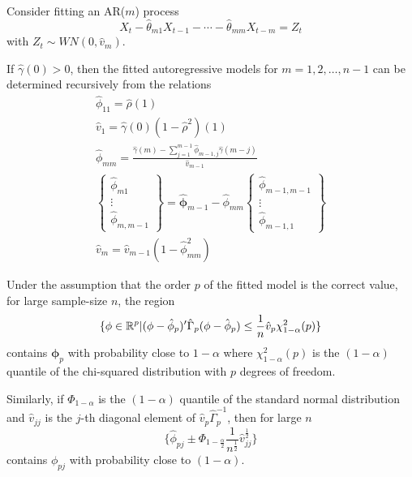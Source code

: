 \begin{thm}
  \label{defn:estimation_arma:3}
  Consider fitting an AR($m$) process
  \begin{equation}
    \label{eq:49}
    X_{t} - \hat \theta_{m1} X_{t-1} - \cdots - \hat \theta_{mm}
    X_{t-m} = Z_{t}
  \end{equation} with $Z_{t} \sim WN(0, \hat v_{m})$.

  If $\hat \gamma(0) > 0$, then the fitted autoregressive models for
  $m = 1, 2, \dots, n - 1$ can be determined recursively from the
  relations
  \begin{align}
    \label{eq:48}
    \hat \phi_{11} = \hat \rho(1) \\
    \hat v_{1} = \hat \gamma(0) (1 - \hat \rho^{2})(1) \\
    \hat \phi_{mm} = \frac{\hat \gamma(m) - \sum_{j=1}^{m-1} \hat
      \phi_{m-1, j} \hat \gamma(m - j)}{\hat v_{m-1}} \\
    \begin{Bmatrix}
      \hat \phi_{m1} \\
      \vdots \\
      \hat \phi_{m, m - 1}
    \end{Bmatrix}
    = \hat{\mathbf{\phi}}_{m-1} - \hat \phi_{mm}
    \begin{Bmatrix}
      \hat \phi_{m-1, m-1} \\
      \vdots\ \\
      \hat \phi_{m-1, 1}
    \end{Bmatrix} \\
    \hat v_{m} = \hat v_{m-1}(1 - \hat \phi^{2}_{mm})
  \end{align}
\end{thm}


\begin{thm}
  \label{defn:estimation_arma:4}
  Under the assumption that the order $p$ of the fitted model is the
  correct value, for large sample-size $n$, the region
  \begin{equation}
    \label{eq:50}
    \{ \mathbf{\phi} \in \mathbb{R}^{p} | (\mathbf{\phi} - \hat \phi_{p})'
    \hat \Gamma_{p} (\mathbf{\phi} - \hat{\mathbf{\phi}}_{p}) \leq
    \frac{1}{n} \hat v_{p} \chi^{2}_{1 - \alpha}(p) \}
  \end{equation} contains $\mathbf{\phi}_{p}$ with probability close
  to $1 - \alpha$ where $\chi^{2}_{1-\alpha}(p)$ is the $(1-\alpha)$
  quantile of the chi-squared distribution with $p$ degrees of
  freedom.

  Similarly, if $\Phi_{1-\alpha}$ is the $(1-\alpha)$ quantile of the
  standard normal distribution and $\hat v_{jj}$ is the $j$-th
  diagonal element of $\hat v_{p} \hat \Gamma_{p}^{-1}$, then for
  large $n$
  \begin{equation}
    \label{eq:51}
    \{ \hat \phi_{pj} \pm \Phi_{1-\frac{\alpha}{2}}
    \frac{1}{n^{\frac{1}{2}}} \hat v_{jj}^{\frac{1}{2}} \}
  \end{equation} contains $\phi_{pj}$ with probability close to $(1 - \alpha)$.
\end{thm}


